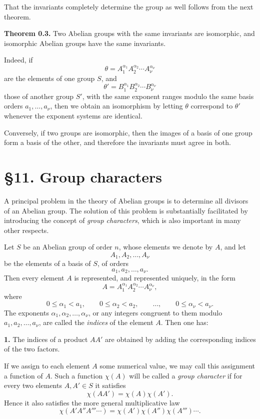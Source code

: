 \documentclass[11pt]{article}
\begin{document}
That the invariants completely determine the group as well follows from the next theorem.

\medskip
\noindent\textbf{Theorem 0.3.}
Two Abelian groups with the same invariants are isomorphic, and isomorphic Abelian groups have the same invariants.

\medskip
Indeed, if
\[
\theta=A_1^{\alpha_1}A_2^{\alpha_2}\cdots A_\nu^{\alpha_\nu}
\]
are the elements of one group \(S\), and
\[
\theta'=B_1^{\alpha_1}B_2^{\alpha_2}\cdots B_\nu^{\alpha_\nu}
\]
those of another group \(S'\), with the same exponent ranges modulo the same basis orders \(a_1,\dots,a_\nu\), then we obtain an isomorphism by letting \(\theta\) correspond to \(\theta'\) whenever the exponent systems are identical.

Conversely, if two groups are isomorphic, then the images of a basis of one group form a basis of the other, and therefore the invariants must agree in both.

\clearpage

\section*{\S 11. Group characters}

A principal problem in the theory of Abelian groups is to determine all divisors of an Abelian group. The solution of this problem is substantially facilitated by introducing the concept of \emph{group characters}, which is also important in many other respects.

Let \(S\) be an Abelian group of order \(n\), whose elements we denote by \(A\), and let
\[
A_1,A_2,\dots,A_\nu
\tag{1}
\]
be the elements of a basis of \(S\), of orders
\[
a_1,a_2,\dots,a_\nu.
\]
Then every element \(A\) is represented, and represented uniquely, in the form
\[
A = A_1^{\alpha_1}A_2^{\alpha_2}\cdots A_\nu^{\alpha_\nu},
\tag{2}
\]
where
\[
0\le \alpha_1<a_1,\qquad 0\le \alpha_2<a_2,\qquad \dots,\qquad 0\le \alpha_\nu<a_\nu.
\tag{3}
\]
The exponents \(\alpha_1,\alpha_2,\dots,\alpha_\nu\), or any integers congruent to them modulo \(a_1,a_2,\dots,a_\nu\), are called the \emph{indices} of the element \(A\). Then one has:

\medskip
\noindent\textbf{1.} The indices of a product \(AA'\) are obtained by adding the corresponding indices of the two factors.

\medskip
If we assign to each element \(A\) some numerical value, we may call this assignment a function of \(A\). Such a function \(\chi(A)\) will be called a \emph{group character} if for every two elements \(A,A'\in S\) it satisfies
\[
\chi(AA')=\chi(A)\chi(A').
\tag{4}
\]
Hence it also satisfies the more general multiplicative law
\[
\chi(A'A''A'''\cdots)=\chi(A')\chi(A'')\chi(A''')\cdots.
\]
\end{document}
